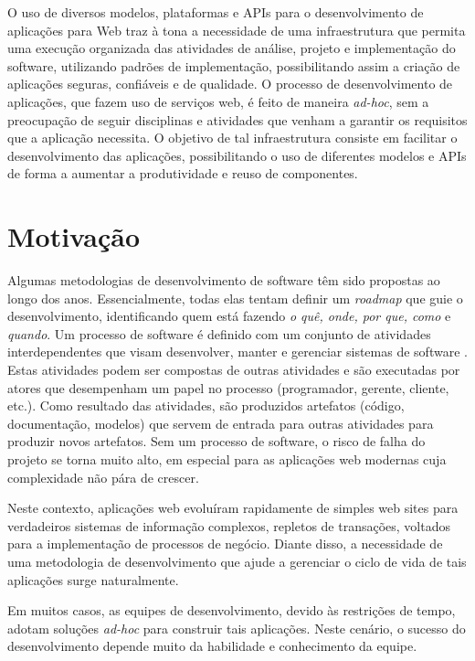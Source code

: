 O uso de diversos modelos, plataformas e APIs para o desenvolvimento de
aplicações para Web traz à tona a necessidade de uma infraestrutura que
permita uma execução organizada das atividades de análise, projeto e implementação do software, utilizando padrões de
implementação, possibilitando assim a criação de aplicações seguras, confiáveis
e de qualidade. O processo de desenvolvimento de aplicações, que fazem uso de
serviços web, é feito de maneira \textit{ad-hoc}, sem a preocupação de seguir
disciplinas e atividades que venham a garantir os requisitos que a aplicação
necessita. O objetivo de tal infraestrutura consiste em facilitar o
desenvolvimento das aplicações, possibilitando o uso de diferentes modelos e
APIs de forma a aumentar a produtividade e reuso de componentes.

\section{Motivação}
\label{sec:Intro-motivation}

Algumas metodologias de desenvolvimento de software têm sido propostas ao longo
dos anos. Essencialmente, todas elas tentam definir um \textit{roadmap} que guie
o desenvolvimento, identificando quem está fazendo \textit{o quê, onde, por que, como} e
\textit{quando}. Um processo de software é definido com um conjunto de atividades interdependentes que visam desenvolver, manter e
gerenciar sistemas de software \cite{sommerville03}. Estas atividades podem ser
compostas de outras atividades e são executadas por atores que desempenham um papel no processo (programador,
gerente, cliente, etc.). Como resultado das atividades, são produzidos artefatos
(código, documentação, modelos) que servem de entrada para outras atividades para
produzir novos artefatos. Sem um processo de software, o risco de falha do projeto se
torna muito alto, em especial para as aplicações web modernas cuja complexidade não
pára de crescer.
 
Neste contexto, aplicações web evoluíram rapidamente de simples web
sites para verdadeiros sistemas
de informação complexos, repletos de transações, voltados para
a implementação de processos de negócio. Diante disso,
a necessidade de uma metodologia de desenvolvimento que ajude a gerenciar o
ciclo de vida de tais aplicações surge naturalmente.

Em muitos casos, as equipes de desenvolvimento, devido às restrições
de tempo, adotam soluções \textit{ad-hoc} para construir tais aplicações. Neste
cenário, o sucesso do desenvolvimento depende muito da habilidade e conhecimento
da equipe.

